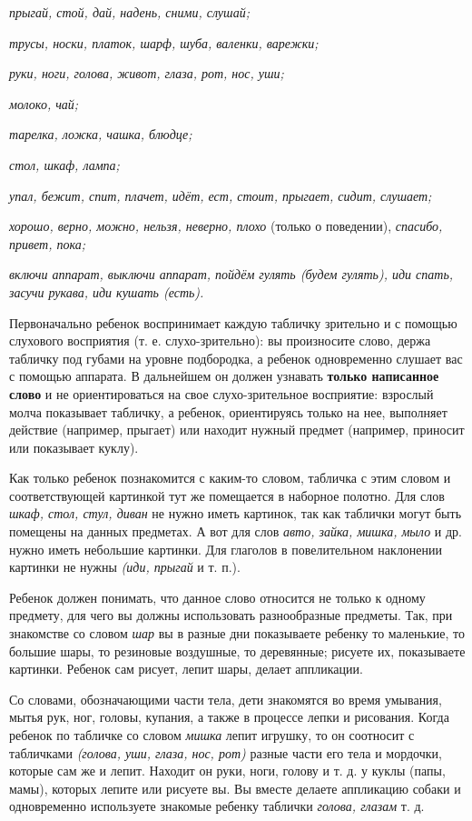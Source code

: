 \documentclass{book}
\renewcommand{\emph}[1]{\textit{#1}}
\begin{document}
\emph{прыгай, стой, дай, надень, сними, слушай;}

\emph{трусы, носки, платок, шарф, шуба, валенки, варежки;}

\emph{руки, ноги, голова, живот, глаза, рот, нос, уши;}

\emph{молоко, чай;}

\emph{тарелка, ложка, чашка, блюдце;}

\emph{стол, шкаф, лампа;}

\emph{упал, бежит, спит, плачет, идёт, ест, стоит, прыгает, сидит,
слушает;}

\emph{хорошо, верно, можно, нельзя, неверно, плохо} (только о
поведении), \emph{спасибо, привет, пока;}

\emph{включи аппарат, выключи аппарат, пойдём гулять (будем гулять), иди
спать, засучи рукава, иди кушать (есть).}

Первоначально ребенок воспринимает каждую табличку зрительно и с помощью
слухового восприятия (т. е. слухо-зрительно): вы произносите слово,
держа табличку под губами на уровне подбородка, а ребенок одновременно
слушает вас с помощью аппарата. В дальнейшем он должен узнавать
\textbf{только написанное слово} и не ориентироваться на свое
слухо-зрительное восприятие: взрослый молча показывает табличку, а
ребенок, ориентируясь только на нее, выполняет действие (например,
прыгает) или находит нужный предмет (например, приносит или показывает
куклу).

Как только ребенок познакомится с каким-то словом, табличка с этим
словом и соответствующей картинкой тут же помещается в наборное полотно.
Для слов \emph{шкаф, стол, стул, диван} не нужно иметь картинок, так как
таблички могут быть помещены на данных предметах. А вот для слов
\emph{авто, зайка, мишка, мыло} и др. нужно иметь небольшие картинки.
Для глаголов в повелительном наклонении картинки не нужны \emph{(иди,
прыгай} и т. п.).

Ребенок должен понимать, что данное слово относится не только к одному
предмету, для чего вы должны использовать разнообразные предметы. Так,
при знакомстве со словом \emph{шар} вы в разные дни показываете ребенку
то маленькие, то большие шары, то резиновые воздушные, то деревянные;
рисуете их, показываете картинки. Ребенок сам рисует, лепит шары, делает
аппликации.

Со словами, обозначающими части тела, дети знакомятся во время умывания,
мытья рук, ног, головы, купания, а также в процессе лепки и рисования.
Когда ребенок по табличке со словом \emph{мишка} лепит игрушку, то он
соотносит с табличками \emph{(голова, уши, глаза, нос, рот)} разные
части его тела и мордочки, которые сам же и лепит. Находит он руки,
ноги, голову и т. д. у куклы (папы, мамы), которых лепите или рисуете
вы. Вы вместе делаете аппликацию собаки и одновременно используете
знакомые ребенку таблички \emph{голова, глазам} т. д.
\end{document}
